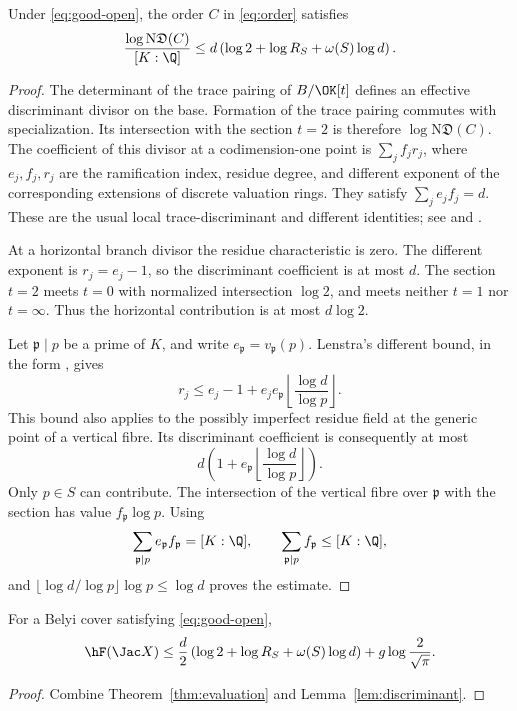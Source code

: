 \begin{lemma}\label{lem:discriminant}
Under \eqref{eq:good-open}, the order $C$ in \eqref{eq:order}
satisfies
\[
 \frac{\log\mathrm N\mathfrak D(C)}{[K:\Q]}
 \le d\left(\log2+\log R_S+\omega(S)\log d\right).
\]
\end{lemma}
\begin{proof}
The determinant of the trace pairing of $B/\OK[t]$ defines an
effective discriminant divisor on the base. Formation of the trace
pairing commutes with specialization. Its intersection with the
section $t=2$ is therefore $\log\mathrm N\mathfrak D(C)$.
The coefficient of this divisor at a codimension-one point is
$\sum_j f_jr_j$, where $e_j,f_j,r_j$ are the ramification index,
residue degree, and different exponent of the corresponding
extensions of discrete valuation rings. They satisfy
$\sum_j e_jf_j=d$. These are the usual local
trace-discriminant and different identities; see
\cite[Chapter~III, Sections~3 and~6]{Serre} and
\cite[Section~4.2]{Javanpeykar}.

At a horizontal branch divisor the residue characteristic is zero.
The different exponent is $r_j=e_j-1$, so the discriminant
coefficient is at most $d$. The section $t=2$ meets $t=0$
with normalized intersection $\log2$, and meets neither $t=1$
nor $t=\infty$. Thus the horizontal contribution is at most
$d\log2$.

Let $\mathfrak p\mid p$ be a prime of $K$, and write
$e_{\mathfrak p}=v_{\mathfrak p}(p)$.
Lenstra's different bound, in the form
\cite[Proposition~4.1.3]{Javanpeykar}, gives
\[
 r_j\le e_j-1+e_j e_{\mathfrak p}
                \left\lfloor\frac{\log d}{\log p}\right\rfloor.
\]
This bound also applies to the possibly imperfect residue field
at the generic point of a vertical fibre.
Its discriminant coefficient is consequently at most
\[
 d\left(1+e_{\mathfrak p}
                \left\lfloor\frac{\log d}{\log p}\right\rfloor\right).
\]
Only $p\in S$ can contribute. The intersection of the vertical
fibre over $\mathfrak p$ with the section has value
$f_{\mathfrak p}\log p$. Using
\[
 \sum_{\mathfrak p\mid p}e_{\mathfrak p}f_{\mathfrak p}=[K:\Q],
 \qquad \sum_{\mathfrak p\mid p}f_{\mathfrak p}\le[K:\Q],
\]
and
$\lfloor\log d/\log p\rfloor\log p\le\log d$
proves the estimate.
\end{proof}

\begin{theorem}\label{thm:coverheight}
For a Belyi cover satisfying \eqref{eq:good-open},
\begin{equation}\label{eq:coverheight}
 \hF(\Jac X)
 \le\frac d2\left(\log2+\log R_S+\omega(S)\log d\right)
       +g\log\frac2{\sqrt\pi}.
\end{equation}
\end{theorem}
\begin{proof}
Combine Theorem~\ref{thm:evaluation} and
Lemma~\ref{lem:discriminant}.
\end{proof}


